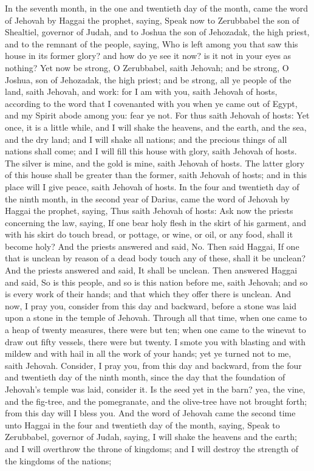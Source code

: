 In the seventh month, in the one and twentieth day of the month, came the word of Jehovah by Haggai the prophet, saying, Speak now to Zerubbabel the son of Shealtiel, governor of Judah, and to Joshua the son of Jehozadak, the high priest, and to the remnant of the people, saying, Who is left among you that saw this house in its former glory? and how do ye see it now? is it not in your eyes as nothing? Yet now be strong, O Zerubbabel, saith Jehovah; and be strong, O Joshua, son of Jehozadak, the high priest; and be strong, all ye people of the land, saith Jehovah, and work: for I am with you, saith Jehovah of hosts, according to the word that I covenanted with you when ye came out of Egypt, and my Spirit abode among you: fear ye not. For thus saith Jehovah of hosts: Yet once, it is a little while, and I will shake the heavens, and the earth, and the sea, and the dry land; and I will shake all nations; and the precious things of all nations shall come; and I will fill this house with glory, saith Jehovah of hosts. The silver is mine, and the gold is mine, saith Jehovah of hosts. The latter glory of this house shall be greater than the former, saith Jehovah of hosts; and in this place will I give peace, saith Jehovah of hosts.  In the four and twentieth day of the ninth month, in the second year of Darius, came the word of Jehovah by Haggai the prophet, saying, Thus saith Jehovah of hosts: Ask now the priests concerning the law, saying, If one bear holy flesh in the skirt of his garment, and with his skirt do touch bread, or pottage, or wine, or oil, or any food, shall it become holy? And the priests answered and said, No. Then said Haggai, If one that is unclean by reason of a dead body touch any of these, shall it be unclean? And the priests answered and said, It shall be unclean. Then answered Haggai and said, So is this people, and so is this nation before me, saith Jehovah; and so is every work of their hands; and that which they offer there is unclean. And now, I pray you, consider from this day and backward, before a stone was laid upon a stone in the temple of Jehovah. Through all that time, when one came to a heap of twenty measures, there were but ten; when one came to the winevat to draw out fifty vessels, there were but twenty. I smote you with blasting and with mildew and with hail in all the work of your hands; yet ye turned not to me, saith Jehovah. Consider, I pray you, from this day and backward, from the four and twentieth day of the ninth month, since the day that the foundation of Jehovah’s temple was laid, consider it. Is the seed yet in the barn? yea, the vine, and the fig-tree, and the pomegranate, and the olive-tree have not brought forth; from this day will I bless you.  And the word of Jehovah came the second time unto Haggai in the four and twentieth day of the month, saying, Speak to Zerubbabel, governor of Judah, saying, I will shake the heavens and the earth; and I will overthrow the throne of kingdoms; and I will destroy the strength of the kingdoms of the nations; 